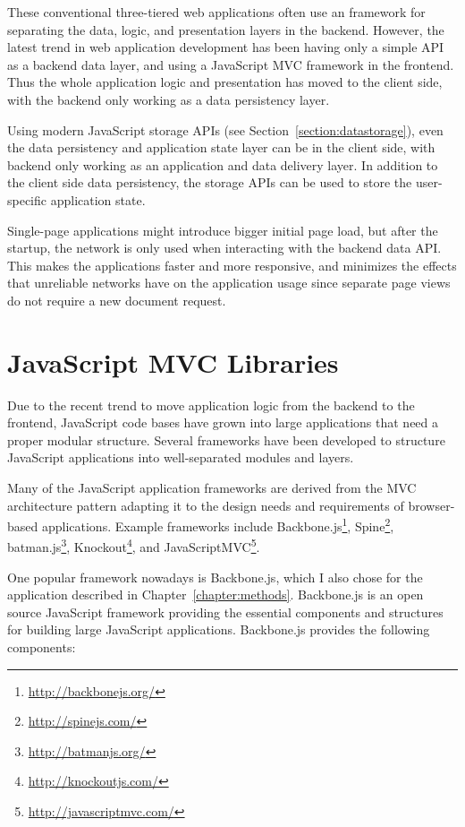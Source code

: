 These conventional three-tiered web applications often use an
 \cite{gamma1995design} framework for separating the data,
logic, and presentation layers in the backend. However, the latest
trend in web application development has been having only a simple
 \cite{fielding2000architectural} API as a backend data
layer, and using a JavaScript MVC framework in the frontend. Thus the
whole application logic and presentation has moved to the client side,
with the backend only working as a data persistency layer.

Using modern JavaScript storage APIs (see
Section~\ref{section:datastorage}), even the data persistency and
application state layer can be in the client side, with backend only
working as an application and data delivery layer. In addition to the
client side data persistency, the storage APIs can be used to store
the user-specific application state.

Single-page applications might introduce bigger initial page load, but
after the startup, the network is only used when interacting with the
backend data API. This makes the applications faster and more
responsive, and minimizes the effects that unreliable networks have on
the application usage since separate page views do not require a new
document request.

\section{JavaScript MVC Libraries}
\label{section:js-mvc}

Due to the recent trend to move application logic from the backend to
the frontend, JavaScript code bases have grown into large applications
that need a proper modular structure. Several frameworks have been
developed to structure JavaScript applications into well-separated
modules and layers.

Many of the JavaScript application frameworks are derived from the MVC
architecture pattern adapting it to the design needs and requirements
of browser-based applications. Example frameworks include
Backbone.js\footnote{\url{http://backbonejs.org/}},
Spine\footnote{\url{http://spinejs.com/}},
batman.js\footnote{\url{http://batmanjs.org/}},
Knockout\footnote{\url{http://knockoutjs.com/}}, and
JavaScriptMVC\footnote{\url{http://javascriptmvc.com/}}.

One popular framework nowadays is Backbone.js, which I also chose for
the application described in
Chapter~\ref{chapter:methods}. Backbone.js is an open source
JavaScript framework providing the essential components and structures
for building large JavaScript applications. Backbone.js provides the
following components:

